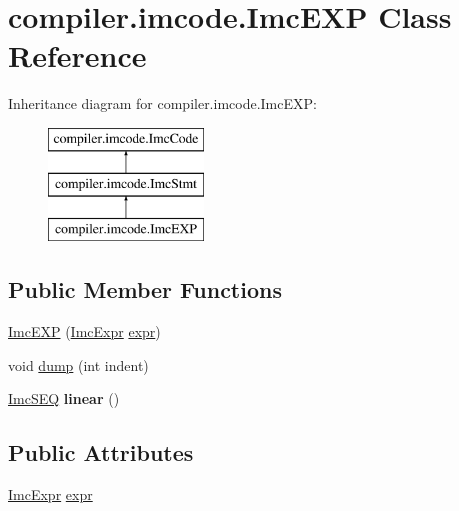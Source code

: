 \hypertarget{classcompiler_1_1imcode_1_1_imc_e_x_p}{}\section{compiler.\+imcode.\+Imc\+E\+XP Class Reference}
\label{classcompiler_1_1imcode_1_1_imc_e_x_p}
Inheritance diagram for compiler.\+imcode.\+Imc\+E\+XP\+:\begin{figure}[H]
\begin{center}
\leavevmode
\includegraphics[height=3.000000cm]{classcompiler_1_1imcode_1_1_imc_e_x_p}
\end{center}
\end{figure}
\subsection*{Public Member Functions}
\begin{DoxyCompactItemize}
\item 
\hyperlink{classcompiler_1_1imcode_1_1_imc_e_x_p_aa8c9b2f6a453ad30994212dc24ca231a}{Imc\+E\+XP} (\hyperlink{classcompiler_1_1imcode_1_1_imc_expr}{Imc\+Expr} \hyperlink{classcompiler_1_1imcode_1_1_imc_e_x_p_a6c27c2311a3fbb303532200e4777832f}{expr})
\item 
void \hyperlink{classcompiler_1_1imcode_1_1_imc_e_x_p_a7ad240b5522d827818a746023afd42ee}{dump} (int indent)
\item 
\mbox{\label{classcompiler_1_1imcode_1_1_imc_e_x_p_abc403a1df821c65c4b6a19d1086fa207}} 
\hyperlink{classcompiler_1_1imcode_1_1_imc_s_e_q}{Imc\+S\+EQ} {\bfseries linear} ()
\end{DoxyCompactItemize}
\subsection*{Public Attributes}
\begin{DoxyCompactItemize}
\item 
\hyperlink{classcompiler_1_1imcode_1_1_imc_expr}{Imc\+Expr} \hyperlink{classcompiler_1_1imcode_1_1_imc_e_x_p_a6c27c2311a3fbb303532200e4777832f}{expr}
\end{DoxyCompactItemize}


